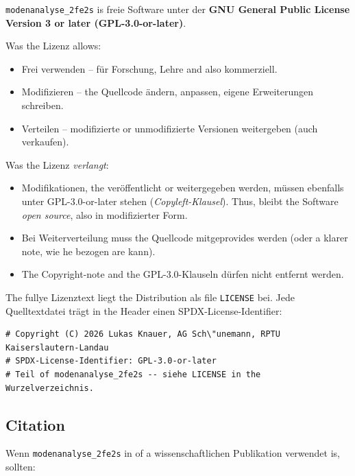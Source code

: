 \documentclass[11pt,a4paper,twoside]{article}
\theoremstyle{remark}
\begin{document}
\texttt{modenanalyse\_2fe2s} is freie Software unter der
\textbf{GNU General Public License Version 3 or later (GPL-3.0-or-later)}.

Was the Lizenz allows:

\begin{itemize}
  \item Frei verwenden -- f\"ur Forschung, Lehre and also kommerziell.
  \item Modifizieren -- the Quellcode \"andern, anpassen, eigene
        Erweiterungen schreiben.
  \item Verteilen -- modifizierte or unmodifizierte Versionen
        weitergeben (auch verkaufen).
\end{itemize}

Was the Lizenz \emph{verlangt}:

\begin{itemize}
  \item Modifikationen, the ver\"offentlicht or weitergegeben werden,
        m\"ussen ebenfalls unter GPL-3.0-or-later stehen
        (\emph{Copyleft-Klausel}). Thus, bleibt the Software
        \emph{open source}, also in modifizierter Form.
  \item Bei Weiterverteilung muss the Quellcode mitgeprovides werden
        (oder a klarer note, wie he bezogen are kann).
  \item The Copyright-note and the GPL-3.0-Klauseln d\"urfen nicht
        entfernt werden.
\end{itemize}

The fullye Lizenztext liegt the Distribution als file
\texttt{LICENSE} bei. Jede Quelltextdatei tr\"agt in the Header einen
SPDX-License-Identifier:

\begin{lstlisting}[style=python]
# Copyright (C) 2026 Lukas Knauer, AG Sch\"unemann, RPTU Kaiserslautern-Landau
# SPDX-License-Identifier: GPL-3.0-or-later
# Teil of modenanalyse_2fe2s -- siehe LICENSE in the Wurzelverzeichnis.
\end{lstlisting}

\subsection{Citation}

Wenn \texttt{modenanalyse\_2fe2s} in of a wissenschaftlichen
Publikation verwendet is, sollten:
\end{document}
